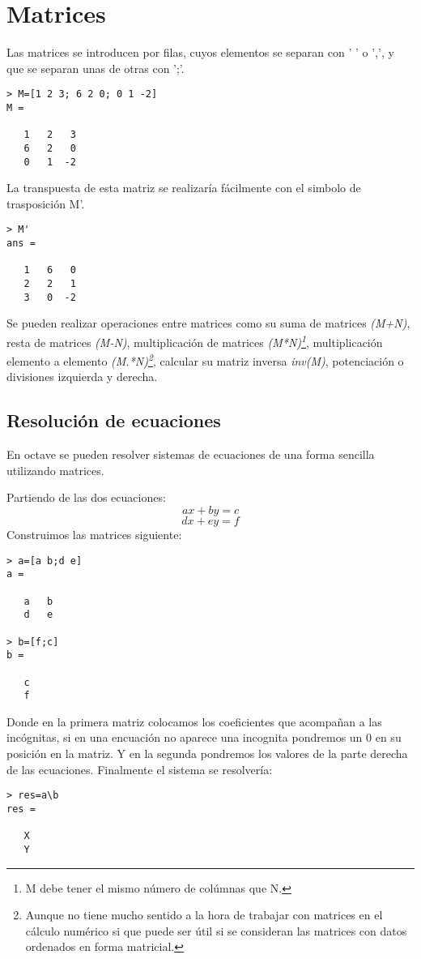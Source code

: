 \documentclass[a4,12pt]{article}
\begin{document}
\section{Matrices}
Las matrices se introducen por filas, cuyos elementos se separan con ' ' o ',', y que se separan unas de otras con ';'.
\begin{verbatim}> M=[1 2 3; 6 2 0; 0 1 -2]
M =

   1   2   3
   6   2   0
   0   1  -2
\end{verbatim}
La transpuesta de esta matriz se realizaría fácilmente con el simbolo de trasposición M'.
\begin{verbatim}
> M'
ans =

   1   6   0
   2   2   1
   3   0  -2
\end{verbatim}
Se pueden realizar operaciones entre matrices como su suma de matrices \emph{(M+N)}, resta de matrices \emph{(M-N)}, multiplicación de matrices \emph{(M*N)\footnote{M debe tener el mismo número de colúmnas que N.}}, multiplicación elemento a elemento \emph{(M.*N)\footnote{Aunque no tiene mucho sentido a la hora de trabajar con matrices en el cálculo numérico si que puede ser útil si se consideran las matrices con datos ordenados en forma matricial.}}, calcular su matriz inversa \emph{inv(M)}, potenciación o divisiones izquierda y derecha.
\subsection{Resolución de ecuaciones}
En octave se pueden resolver sistemas de ecuaciones de una forma sencilla utilizando matrices.

Partiendo de las dos ecuaciones:
\begin{displaymath}
ax+by=c
\end{displaymath} 
\begin{displaymath} 
dx+ey=f
\end{displaymath} 
Construimos las matrices siguiente:
\begin{verbatim}
> a=[a b;d e]
a =

   a   b
   d   e

> b=[f;c]
b =

   c
   f
\end{verbatim}
Donde en la primera matriz colocamos los coeficientes que acompañan a las incógnitas, si en una encuación no aparece una incognita pondremos un 0 en su posición en la matriz. Y en la segunda pondremos los valores de la parte derecha de las ecuaciones. Finalmente el sistema se resolvería:
\begin{verbatim}
> res=a\b
res =

   X
   Y
\end{verbatim}
\end{document}
